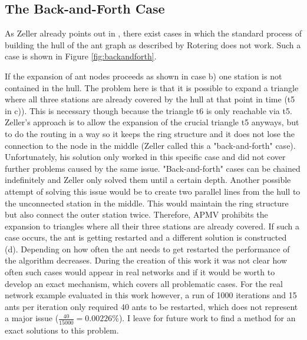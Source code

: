 \subsection{The Back-and-Forth Case}\label{backandforth}
As Zeller already points out in \cite{zeller2021planung}, there exist cases in which the standard process of building the hull  of the ant graph as described by Rotering does not work. Such a case is shown in Figure \ref{fig:backandforth}.

If the expansion of ant nodes proceeds as shown in case b) one station is not contained in the hull. The problem here is that it is possible to expand a triangle where all three stations are already covered by the hull at that point in time (t5 in c)). This is necessary though because the triangle t6 is only reachable via t5. Zeller's approach is to allow the expansion of the crucial triangle t5 anyways, but to do the routing in a way so it keeps the ring structure and it does not lose the connection to the node in the middle (Zeller called this a "back-and-forth" case). Unfortunately, his solution only worked in this specific case and did not cover further problems caused by the same issue. "Back-and-forth" cases can be chained indefinitely and Zeller only solved them until a certain depth. Another possible attempt of solving this issue would be to create two parallel lines from the hull to the unconnected station in the middle. This would maintain the ring structure but also connect the outer station twice. Therefore, APMV prohibits the expansion to triangles where all their three stations are already covered. If such a case occurs, the ant is getting restarted and a different solution is constructed (d). Depending on how often the ant needs to get restarted the performance of the algorithm decreases. During the creation of this work it was not clear how often such cases would appear in real networks and if it would be worth to develop an exact mechanism, which covers all problematic cases. For the real network example evaluated in this work however, a run of 1000 iterations and 15 ants per iteration only required 40 ants to be restarted, which does not represent a major issue ($\frac{40}{15000} = 0.00226 \%$). I leave for future work to find a method for an exact solutions to this problem.

